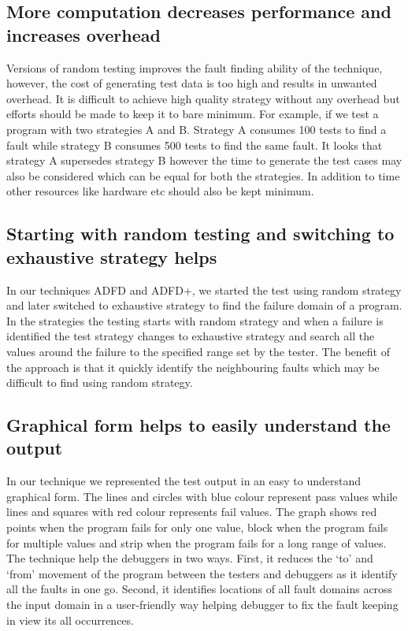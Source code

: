 \subsection{More computation decreases performance and increases overhead}
Versions of random testing \cite{} improves the fault finding ability of the technique, however, the cost of generating test data is too high and results in unwanted overhead. It is difficult to achieve high quality strategy without any overhead but efforts should be made to keep it to bare minimum. For example, if we test a program with two strategies A and B. Strategy A consumes 100 tests to find a fault while strategy B consumes 500 tests to find the same fault.  It looks that strategy A supersedes strategy B however the time to generate the test cases may also be considered which can be equal for both the strategies. In addition to time other resources like hardware etc should also be kept minimum.


\subsection{Starting with random testing and switching to exhaustive strategy helps}
In our techniques ADFD and ADFD+, we started the test using random strategy and later switched to exhaustive strategy to find the failure domain of a program. In the strategies the testing starts with random strategy and when a failure is identified the test strategy changes to exhaustive strategy and search all the values around the failure to the specified range set by the tester. The benefit of the approach is that it quickly identify the neighbouring faults which may be difficult to find using random strategy. 


\subsection{Graphical form helps to easily understand the output}
In our technique we represented the test output in an easy to understand graphical form. The lines and circles with blue colour represent pass values while lines and squares with red colour represents fail values. The graph shows red points when the program fails for only one value, block when the program fails for multiple values and strip when the program fails for a long range of values.  The technique help the debuggers in two ways. First, it reduces the `to' and `from' movement of the program between the testers and debuggers as it identify all the faults in one go. Second, it identifies locations of all fault domains across the input domain in a user-friendly way helping debugger to fix the fault keeping in view its all occurrences.

